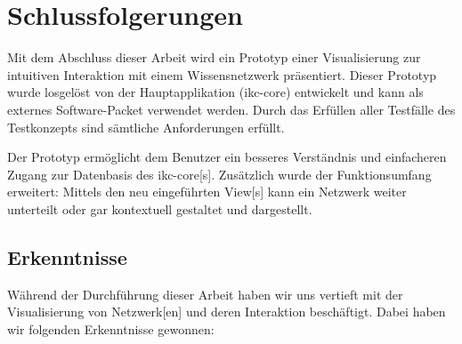 \chapter{Schlussfolgerungen}
Mit dem Abschluss dieser Arbeit wird ein Prototyp einer Visualisierung zur intuitiven Interaktion mit einem Wissensnetzwerk präsentiert. Dieser Prototyp wurde losgelöst von der Hauptapplikation (\gls{ikc-core}) entwickelt und kann als externes Software-Packet verwendet werden. Durch das Erfüllen aller Testfälle des Testkonzepts sind sämtliche Anforderungen erfüllt.

Der Prototyp ermöglicht dem Benutzer ein besseres Verständnis und einfacheren Zugang zur Datenbasis des \gls{ikc-core}[s]. Zusätzlich wurde der Funktionsumfang erweitert: Mittels den neu eingeführten \gls{View}[s] kann ein \gls{Netzwerk} weiter unterteilt oder gar kontextuell gestaltet und dargestellt.

\section{Erkenntnisse}
Während der Durchführung dieser Arbeit haben wir uns vertieft mit der Visualisierung von \gls{Netzwerk}[en] und deren Interaktion beschäftigt. Dabei haben wir folgenden Erkenntnisse gewonnen: 

